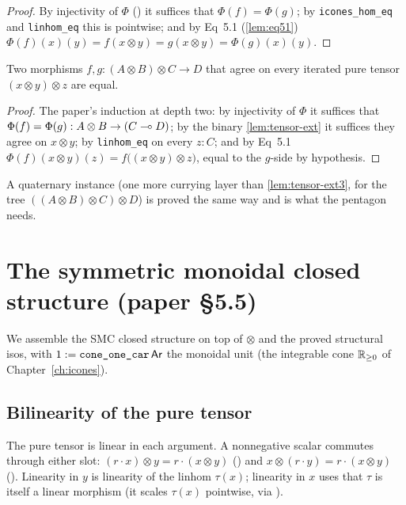 \begin{proof}
By injectivity of $\Phi$
() it suffices that
$\Phi(f) = \Phi(g)$; by \texttt{icones\_hom\_eq} and
\texttt{linhom\_eq} this is pointwise; and by Eq~5.1
(\autoref{lem:eq51}) $\Phi(f)(x)(y) = f(x \otimes y) = g(x \otimes y) =
\Phi(g)(x)(y)$.
\end{proof}

\begin{lemma}\label{lem:tensor-ext3}
\rocqok
{}
Two morphisms $f, g : (A \otimes B) \otimes C \to D$ that agree on
every iterated pure tensor $(x \otimes y) \otimes z$ are equal.
\end{lemma}

\begin{proof}
The paper's induction at depth two: by injectivity of $\Phi$ it
suffices that $\Phi(f) = \Phi(g) : A \otimes B \to (C \multimap D)$; by the
binary \autoref{lem:tensor-ext} it suffices they agree on $x \otimes
y$; by \texttt{linhom\_eq} on every $z : C$; and by Eq~5.1 $\Phi(f)(x
\otimes y)(z) = f\bigl((x \otimes y) \otimes z\bigr)$, equal to the
$g$-side by hypothesis.
\end{proof}

A quaternary instance
\rocqok (one more currying layer
than \autoref{lem:tensor-ext3}, for the tree $((A \otimes B) \otimes C)
\otimes D$) is proved the same way and is what the pentagon needs.

\section{The symmetric monoidal closed structure (paper \S5.5)}%
\label{sec:smcc}

We assemble the SMC closed structure on top of $\otimes$ and the proved
structural isos, with $1 := \texttt{cone\_one\_car}\,\mathsf{Ar}$ the monoidal
unit (the integrable cone $\mathbb{R}_{\geq 0}$ of Chapter~\ref{ch:icones}).

\subsection{Bilinearity of the pure tensor}\label{sec:tensor-bilin}

\begin{lemma}\label{lem:tensor-bilin}
\rocqok
{}\rocqok
{}
The pure tensor is linear in each argument. A nonnegative scalar
commutes through either slot:
$(r \cdot x) \otimes y = r \cdot (x \otimes y)$
() and $x \otimes (r \cdot y) = r
\cdot (x \otimes y)$ (). Linearity in
$y$ is linearity of the linhom $\tau(x)$; linearity in $x$ uses that
$\tau$ is itself a linear morphism (it scales $\tau(x)$ pointwise, via
).
\end{lemma}

